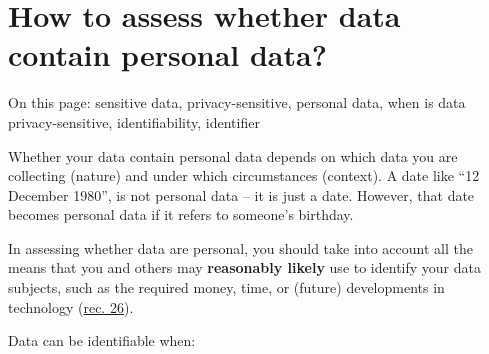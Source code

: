 \documentclass[
]{book}
\begin{document}
\hypertarget{personal-data-assess}{%
\section{How to assess whether data contain personal data?}\label{personal-data-assess}}

On this page: sensitive data, privacy-sensitive, personal data, when is data
privacy-sensitive, identifiability, identifier

Whether your data contain personal data depends on which data you are
collecting (nature) and under which circumstances (context). A date like
``12 December 1980'', is not personal data -- it is just a date. However, that
date becomes personal data if it refers to someone's birthday.

In assessing whether data are personal, you should take into account all the
means that you and others may \textbf{reasonably likely} use to identify your data
subjects, such as the required money, time, or (future) developments in
technology (\href{https://gdpr-info.eu/recitals/no-26/}{rec. 26}).

Data can be identifiable when:
\end{document}
